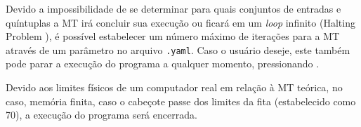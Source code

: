 Devido a impossibilidade de se determinar para quais conjuntos de entradas e
quíntuplas a MT irá concluir sua execução ou ficará em um \textit{loop} infinito
(Halting Problem \cite{turing}), é possível estabelecer um número máximo de
iterações para a MT através de um parâmetro no arquivo \verb|.yaml|. Caso o
usuário deseje, este também pode parar a execução do programa a qualquer
momento, pressionando \linebreak {}.

Devido aos limites físicos de um computador real em relação à MT teórica, no
caso, memória finita, caso o cabeçote passe dos limites da fita (estabelecido
como 70), a execução do programa será encerrada.